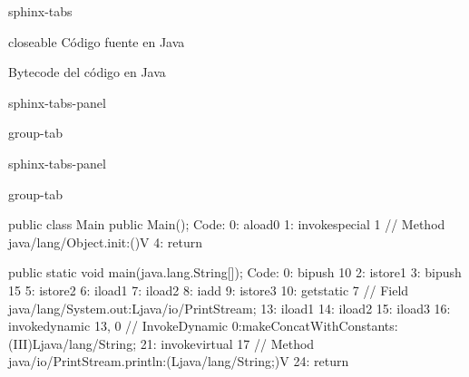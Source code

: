 \documentclass[letterpaper,10pt,spanish]{sphinxmanual}
\begin{document}
\begin{sphinxuseclass}{sphinx-tabs}
\begin{sphinxuseclass}{closeable}
\sphinxAtStartPar
Código fuente en Java

\sphinxAtStartPar
Bytecode del código en Java

\end{sphinxuseclass}
\begin{sphinxuseclass}{sphinx-tabs-panel}
\begin{sphinxuseclass}{group-tab}
\begin{sphinxVerbatim}[commandchars=\\\{\}]
   
       \PYG{o}{[}\PYG{o}{]}  
           

          
          

            

                  
\end{sphinxVerbatim}

\end{sphinxuseclass}
\end{sphinxuseclass}
\begin{sphinxuseclass}{sphinx-tabs-panel}
\begin{sphinxuseclass}{group-tab}
\begin{sphinxVerbatim}[commandchars=\\\{\}]
public class Main \PYGZob{}
    public Main();
        Code:
        0: aload\PYGZus{}0
        1: invokespecial \PYGZsh{}1                  // Method java/lang/Object.\PYGZdq{}\PYGZlt{}init\PYGZgt{}\PYGZdq{}:()V
        4: return

    public static void main(java.lang.String[]);
        Code:
        0: bipush        10
        2: istore\PYGZus{}1
        3: bipush        15
        5: istore\PYGZus{}2
        6: iload\PYGZus{}1
        7: iload\PYGZus{}2
        8: iadd
        9: istore\PYGZus{}3
        10: getstatic     \PYGZsh{}7                  // Field java/lang/System.out:Ljava/io/PrintStream;
        13: iload\PYGZus{}1
        14: iload\PYGZus{}2
        15: iload\PYGZus{}3
        16: invokedynamic \PYGZsh{}13,  0             // InvokeDynamic \PYGZsh{}0:makeConcatWithConstants:(III)Ljava/lang/String;
        21: invokevirtual \PYGZsh{}17                 // Method java/io/PrintStream.println:(Ljava/lang/String;)V
        24: return
    \PYGZcb{}
\end{sphinxVerbatim}


\end{sphinxuseclass}
\end{sphinxuseclass}
\end{sphinxuseclass}
\end{document}
